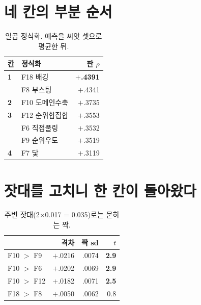 \documentclass[10pt]{article}
\begin{document}

\section{네 칸의 부분 순서}

\begin{table}[t]
\centering\tsize
\caption{일곱 정식화. 예측을 씨앗 셋으로 평균한 뒤.}
\begin{tabular}{llr}
\toprule
칸 & 정식화 & 판 $\rho$ \\
\midrule
\textbf{1} & F18 배깅 & \textbf{$+$.4391} \\
& F8 부스팅 & $+$.4341 \\
\textbf{2} & F10 도메인수축 & $+$.3735 \\
\textbf{3} & F12 순위합집합 & $+$.3553 \\
& F6 직접풀링 & $+$.3532 \\
& F9 순위우도 & $+$.3519 \\
\textbf{4} & F7 닻 & $+$.3119 \\
\bottomrule
\end{tabular}
\end{table}


\section{잣대를 고치니 한 칸이 돌아왔다}

\begin{table}[t]
\centering\tsize
\caption{주변 잣대(2$\times$0.017 = 0.035)로는 묻히는 짝.}
\begin{tabular}{lrrr}
\toprule
& 격차 & 짝 sd & $t$ \\
\midrule
F10 $>$ F9 & $+$.0216 & .0074 & \textbf{2.9} \\
F10 $>$ F6 & $+$.0202 & .0069 & \textbf{2.9} \\
F10 $>$ F12 & $+$.0182 & .0071 & \textbf{2.5} \\
\midrule
F18 $>$ F8 & $+$.0050 & .0062 & 0.8 \\
\bottomrule
\end{tabular}
\end{table}
\end{document}
